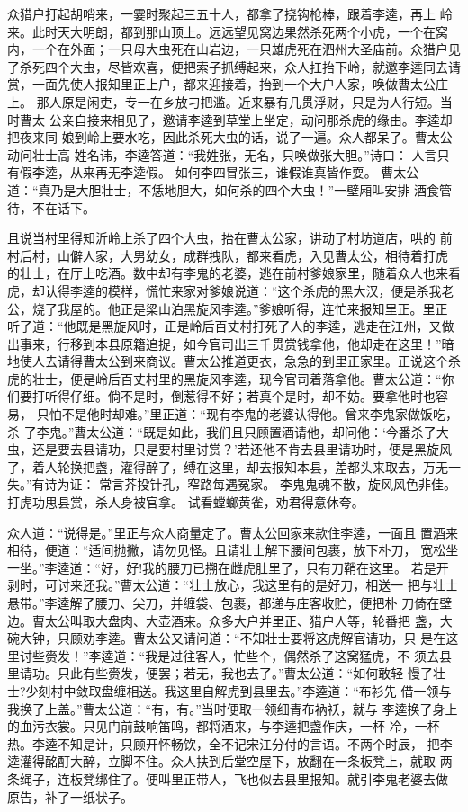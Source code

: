 众猎户打起胡哨来，一霎时聚起三五十人，都拿了挠钩枪棒，跟着李逵，再上
岭来。此时天大明朗，都到那山顶上。远远望见窝边果然杀死两个小虎，一个在窝
内，一个在外面；一只母大虫死在山岩边，一只雄虎死在泗州大圣庙前。众猎户见
了杀死四个大虫，尽皆欢喜，便把索子抓缚起来，众人扛抬下岭，就邀李逵同去请
赏，一面先使人报知里正上户，都来迎接着，抬到一个大户人家，唤做曹太公庄上。
那人原是闲吏，专一在乡放刁把滥。近来暴有几贯浮财，只是为人行短。当时曹太
公亲自接来相见了，邀请李逵到草堂上坐定，动问那杀虎的缘由。李逵却把夜来同
娘到岭上要水吃，因此杀死大虫的话，说了一遍。众人都呆了。曹太公动问壮士高
姓名讳，李逵答道：“我姓张，无名，只唤做张大胆。”诗曰：
人言只有假李逵，从来再无李逵假。
如何李四冒张三，谁假谁真皆作耍。
曹太公道：“真乃是大胆壮士，不恁地胆大，如何杀的四个大虫！”一壁厢叫安排
酒食管待，不在话下。

且说当村里得知沂岭上杀了四个大虫，抬在曹太公家，讲动了村坊道店，哄的
前村后村，山僻人家，大男幼女，成群拽队，都来看虎，入见曹太公，相待着打虎
的壮士，在厅上吃酒。数中却有李鬼的老婆，逃在前村爹娘家里，随着众人也来看
虎，却认得李逵的模样，慌忙来家对爹娘说道：“这个杀虎的黑大汉，便是杀我老
公，烧了我屋的。他正是梁山泊黑旋风李逵。”爹娘听得，连忙来报知里正。里正
听了道：“他既是黑旋风时，正是岭后百丈村打死了人的李逵，逃走在江州，又做
出事来，行移到本县原籍追捉，如今官司出三千贯赏钱拿他，他却走在这里！”暗
地使人去请得曹太公到来商议。曹太公推道更衣，急急的到里正家里。正说这个杀
虎的壮士，便是岭后百丈村里的黑旋风李逵，现今官司着落拿他。曹太公道：“你
们要打听得仔细。倘不是时，倒惹得不好；若真个是时，却不妨。要拿他时也容易，
只怕不是他时却难。”里正道：“现有李鬼的老婆认得他。曾来李鬼家做饭吃，杀
了李鬼。”曹太公道：“既是如此，我们且只顾置酒请他，却问他：‘今番杀了大
虫，还是要去县请功，只是要村里讨赏？’若还他不肯去县里请功时，便是黑旋风
了，着人轮换把盏，灌得醉了，缚在这里，却去报知本县，差都头来取去，万无一
失。”有诗为证：
常言芥投针孔，窄路每遇冤家。
李鬼鬼魂不散，旋风风色非佳。
打虎功思县赏，杀人身被官拿。
试看螳螂黄雀，劝君得意休夸。

众人道：“说得是。”里正与众人商量定了。曹太公回家来款住李逵，一面且
置酒来相待，便道：“适间抛撇，请勿见怪。且请壮士解下腰间包裹，放下朴刀，
宽松坐一坐。”李逵道：“好，好!我的腰刀已搠在雌虎肚里了，只有刀鞘在这里。
若是开剥时，可讨来还我。”曹太公道：“壮士放心，我这里有的是好刀，相送一
把与壮士悬带。”李逵解了腰刀、尖刀，并缠袋、包裹，都递与庄客收贮，便把朴
刀倚在壁边。曹太公叫取大盘肉、大壶酒来。众多大户并里正、猎户人等，轮番把
盏，大碗大钟，只顾劝李逵。曹太公又请问道：“不知壮士要将这虎解官请功，只
是在这里讨些赍发！”李逵道：“我是过往客人，忙些个，偶然杀了这窝猛虎，不
须去县里请功。只此有些赍发，便罢；若无，我也去了。”曹太公道：“如何敢轻
慢了壮士?少刻村中敛取盘缠相送。我这里自解虎到县里去。”李逵道：“布衫先
借一领与我换了上盖。”曹太公道：“有，有。”当时便取一领细青布衲袄，就与
李逵换了身上的血污衣裳。只见门前鼓响笛鸣，都将酒来，与李逵把盏作庆，一杯
冷，一杯热。李逵不知是计，只顾开怀畅饮，全不记宋江分付的言语。不两个时辰，
把李逵灌得酩酊大醉，立脚不住。众人扶到后堂空屋下，放翻在一条板凳上，就取
两条绳子，连板凳绑住了。便叫里正带人，飞也似去县里报知。就引李鬼老婆去做
原告，补了一纸状子。

